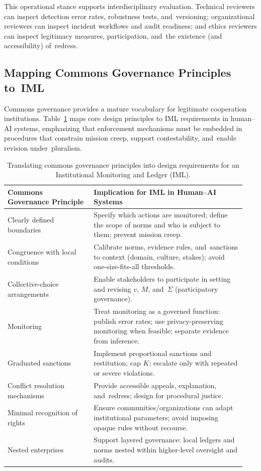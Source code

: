 \documentclass[mca,article,accept,pdftex,oneauthor]{Definitions/mdpi}
\begin{document}
This operational stance supports interdisciplinary evaluation. Technical reviewers can inspect detection error rates, robustness tests, and~versioning; organizational reviewers can inspect incident workflows and audit readiness; and ethics reviewers can inspect legitimacy measures, participation, and~the existence (and accessibility) of~redress.

\subsection{Mapping Commons Governance Principles to~IML}
\label{sec:ostrom_map}

Commons governance provides a mature vocabulary for legitimate cooperation institutions. Table~\ref{tab:ostrom} maps core design principles \citep{Ostrom1990} to IML requirements in human--AI systems, emphasizing that enforcement mechanisms must be embedded in procedures that constrain mission creep, support contestability, and~enable revision under~pluralism.

\begin{table}[H]%
\small
\caption{Translating commons governance principles into design requirements for an Institutional Monitoring and Ledger (IML).}
\label{tab:ostrom}

\begin{tabular}{p{0.34\linewidth} p{0.60\linewidth}}
\toprule
\textbf{Commons Governance Principle} & \textbf{Implication for IML in Human--AI Systems} \\
\midrule
Clearly defined boundaries & Specify which actions are monitored; define the scope of norms and who is subject to them; prevent mission creep. \\
Congruence with local conditions & Calibrate norms, evidence rules, and~sanctions to context (domain, culture, stakes); avoid one-size-fits-all thresholds. \\
Collective-choice arrangements & Enable stakeholders to participate in setting and revising $v$, $M$, and~$\Sigma$ (participatory governance). \\
Monitoring & Treat monitoring as a governed function: publish error rates; use privacy-preserving monitoring when feasible; separate evidence from inference. \\
Graduated sanctions & Implement proportional sanctions and restitution; cap $K$; escalate only with repeated or severe violations. \\
Conflict resolution mechanisms & Provide accessible appeals, explanation, and~redress; design for procedural justice. \\
Minimal recognition of rights & Ensure communities/organizations can adapt institutional parameters; avoid imposing opaque rules without recourse. \\
Nested enterprises & Support layered governance: local ledgers and norms nested within higher-level oversight and audits. \\
\bottomrule
\end{tabular}

\end{table}
\unskip
\end{document}
